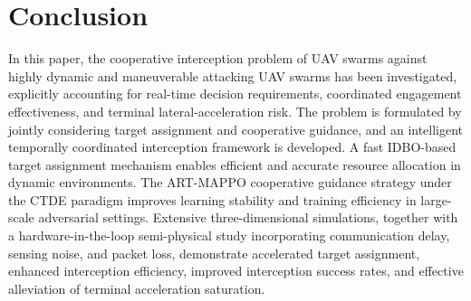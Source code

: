 \documentclass[lettersize,journal]{IEEEtran}
\newcommand{\hladd}[1]{{\color{blue}#1}}
\begin{document}

\section{Conclusion}
\label{sec:conclusion}

In this paper, the cooperative interception problem of UAV swarms against highly dynamic and
maneuverable attacking UAV swarms has been investigated, explicitly accounting for real-time
decision requirements, coordinated engagement effectiveness, and \hladd{terminal lateral-acceleration risk}.
The problem is formulated by jointly considering target assignment and cooperative guidance,
and an intelligent temporally coordinated interception framework is developed.
A fast IDBO-based target assignment mechanism enables efficient and accurate resource
allocation in dynamic environments.
The ART-MAPPO cooperative guidance strategy under the CTDE paradigm improves learning
stability and training efficiency in large-scale adversarial settings.
Extensive \hladd{three-dimensional} simulations\hladd{, together with a hardware-in-the-loop
semi-physical study incorporating communication delay, sensing noise, and packet loss,}
demonstrate accelerated target assignment, enhanced interception efficiency, improved
interception success rates, and effective alleviation of \hladd{terminal acceleration saturation}.
\end{document}
